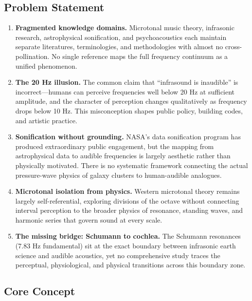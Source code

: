 \documentclass[11pt,letterpaper]{article}
\begin{document}
\subsection{Problem Statement}

\begin{enumerate}[leftmargin=2em]
\item \textbf{Fragmented knowledge domains.} Microtonal music theory, infrasonic research, astrophysical sonification, and psychoacoustics each maintain separate literatures, terminologies, and methodologies with almost no cross-pollination. No single reference maps the full frequency continuum as a unified phenomenon.

\item \textbf{The 20 Hz illusion.} The common claim that ``infrasound is inaudible'' is incorrect---humans can perceive frequencies well below 20 Hz at sufficient amplitude, and the character of perception changes qualitatively as frequency drops below 10 Hz. This misconception shapes public policy, building codes, and artistic practice.

\item \textbf{Sonification without grounding.} NASA's data sonification program has produced extraordinary public engagement, but the mapping from astrophysical data to audible frequencies is largely aesthetic rather than physically motivated. There is no systematic framework connecting the actual pressure-wave physics of galaxy clusters to human-audible analogues.

\item \textbf{Microtonal isolation from physics.} Western microtonal theory remains largely self-referential, exploring divisions of the octave without connecting interval perception to the broader physics of resonance, standing waves, and harmonic series that govern sound at every scale.

\item \textbf{The missing bridge: Schumann to cochlea.} The Schumann resonances (7.83 Hz fundamental) sit at the exact boundary between infrasonic earth science and audible acoustics, yet no comprehensive study traces the perceptual, physiological, and physical transitions across this boundary zone.
\end{enumerate}

\subsection{Core Concept}
\end{document}
